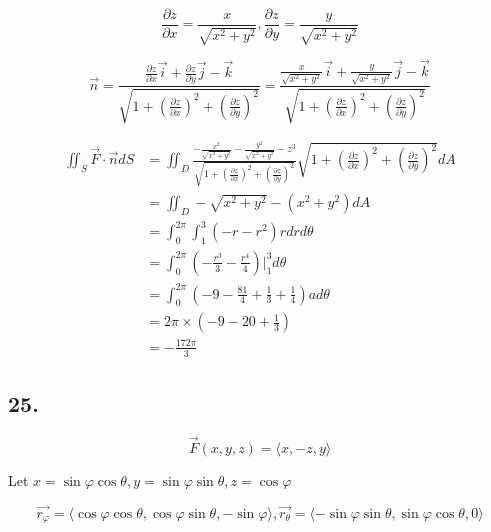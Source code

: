 \documentclass{article}
\begin{document}
    $$\frac{\partial z}{\partial x} = \frac{x}{\sqrt{x^2+y^2}}, \frac{\partial z}{\partial y} = \frac{y}{\sqrt{x^2+y^2}}$$

    $$\overrightarrow{n} = \frac{\frac{\partial z}{\partial x}\overrightarrow i + \frac{\partial z}{\partial y} \overrightarrow j - \overrightarrow k}{\sqrt{1 + (\frac{\partial z}{\partial x})^2 + (\frac{\partial z}{\partial y})^2}} = \frac{\frac{x}{\sqrt{x^2+y^2}} \overrightarrow{i} + \frac{y}{\sqrt{x^2+y^2}} \overrightarrow{j} - \overrightarrow{k}}{\sqrt{1 + (\frac{\partial z}{\partial x})^2 + (\frac{\partial z}{\partial y})^2}}$$

  $$\begin{aligned}
    \iint_S \overrightarrow{F} \cdot \overrightarrow{n} dS &= \iint_D \frac{-\frac{x^2}{\sqrt{x^2+y^2}} -\frac{y^2}{\sqrt{x^2+y^2}} -z^3}{\sqrt{1 + (\frac{\partial z}{\partial x})^2 + (\frac{\partial z}{\partial y})^2}} \sqrt{1 + (\frac{\partial z}{\partial x})^2 + (\frac{\partial z}{\partial y})^2} dA \\
                                                           &= \iint_D -\sqrt{x^2+y^2} - (x^2+y^2) dA \\
                                                           &= \int_0^{2\pi} \int_1^3 (-r-r^2)r dr d\theta \\
                                                           &= \int_0^{2\pi} (-\frac{r^3}{3} - \frac{r^4}{4})\biggl|_1^{3} d\theta \\
                                                           &= \int_0^{2\pi} (-9 - \frac{81}{4} + \frac{1}{3} + \frac{1}{4})a d\theta \\
                                                           &= 2\pi \times (-9 - 20 + \frac{1}{3}) \\
                                                           &= -\frac{172\pi}{3}
  \end{aligned}
  $$

  \subsection*{25. }

  $$\overrightarrow{F}(x, y, z) = \langle x, -z,  y \rangle$$

  Let $x = \sin \varphi \cos \theta, y = \sin \varphi \sin \theta, z = \cos \varphi$

  $$\overrightarrow{r_\varphi} = \langle \cos \varphi \cos \theta, \cos \varphi \sin \theta, -\sin \varphi \rangle, \overrightarrow{r_\theta} = \langle -\sin \varphi \sin \theta, \sin \varphi \cos \theta, 0 \rangle$$
\end{document}
